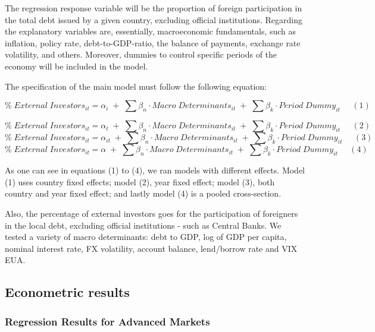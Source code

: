 \documentclass[
]{article}
\begin{document}
The regression response variable will be the proportion of foreign
participation in the total debt issued by a given country, excluding
official institutions. Regarding the explanatory variables are,
essentially, macroeconomic fundamentals, such as inflation, policy rate,
debt-to-GDP-ratio, the balance of payments, exchange rate volatility,
and others. Moreover, dummies to control specific periods of the economy
will be included in the model.

The specification of the main model must follow the following equation:

\[ \%\;External\;Investors_{it} = \alpha_i \;+ \;\sum{\beta_n \cdot Macro\; Determinants_{it}}\; + \;\sum{\beta_k \cdot Period\;Dummy_{it}} \;\;\;\;\; (1)\]

\[\%\;External\;Investors_{it} = \alpha_t \;+ \;\sum{\beta_n \cdot Macro\; Determinants_{it}}\; + \;\sum{\beta_k \cdot Period\;Dummy_{it}} \;\;\;\;\; (2)\]
\[\%\;External\;Investors_{it} = \alpha_{it} \;+ \;\sum{\beta_n \cdot Macro\; Determinants_{it}}\; + \;\sum{\beta_k \cdot Period\;Dummy_{it}} \;\;\;\;\; (3)\]
\[\%\;External\;Investors_{it} = \alpha \;+ \;\sum{\beta_n \cdot Macro\; Determinants_{it}}\; + \;\sum{\beta_k \cdot Period\;Dummy_{it}} \;\;\;\;\; (4)\]

As one can see in equations (1) to (4), we ran models with different
effects. Model (1) uses country fixed effects; model (2), year fixed
effect; model (3), both country and year fixed effect; and lastly model
(4) is a pooled cross-section.

Also, the percentage of external investors goes for the participation of
foreigners in the local debt, excluding official institutions - such as
Central Banks. We tested a variety of macro determinants: debt to GDP,
log of GDP per capita, nominal interest rate, FX volatility, account
balance, lend/borrow rate and VIX EUA.

\hypertarget{econometric-results}{%
\subsection{Econometric results}\label{econometric-results}}

\hypertarget{regression-results-for-advanced-markets}{%
\subsubsection{Regression Results for Advanced
Markets}\label{regression-results-for-advanced-markets}}
\end{document}
